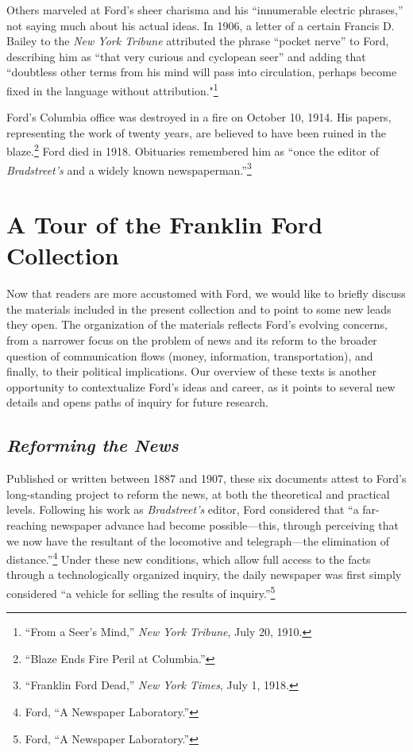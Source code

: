 \documentclass[twoside,symmetric,nobib,justified]{tufte-book}
\begin{document}
\noindent Others marveled at Ford's sheer charisma and his ``innumerable electric
phrases,'' not saying much about his actual ideas. In 1906, a letter of
a certain Francis D. Bailey to the \emph{New York Tribune} attributed
the phrase ``pocket nerve'' to Ford, describing him as ``that very
curious and cyclopean seer'' and adding that ``doubtless other terms
from his mind will pass into circulation, perhaps become fixed in the
language without attribution."\footnote{``From a Seer's Mind,''
  \emph{New York Tribune}, July 20, 1910.}

Ford's Columbia office was destroyed in a fire on October 10, 1914. His
papers, representing the work of twenty years, are believed to have been
ruined in the blaze.\footnote{``Blaze Ends Fire Peril at Columbia.''}
Ford died in 1918. Obituaries remembered him as ``once the editor of
\emph{Bradstreet's} and a widely known newspaperman.''\footnote{``Franklin
  Ford Dead,'' \emph{New York Times}, July 1, 1918.}

\hypertarget{a-tour-of-the-franklin-ford-collection}{%
\section{A Tour of the Franklin Ford
Collection}\label{a-tour-of-the-franklin-ford-collection}}

Now that readers are more accustomed with Ford, we would like to briefly
discuss the materials included in the present collection and to point to
some new leads they open. The organization of the materials reflects
Ford's evolving concerns, from a narrower focus on the problem of news
and its reform to the broader question of communication flows (money,
information, transportation), and finally, to their political
implications. Our overview of these texts is another opportunity to
contextualize Ford's ideas and career, as it points to several new
details and opens paths of inquiry for future research.

\hypertarget{reforming-the-news}{%
\subsection{\texorpdfstring{\emph{Reforming the
News}}{Reforming the News}}\label{reforming-the-news}}

Published or written between 1887 and 1907, these six documents attest
to Ford's long-standing project to reform the news, at both the
theoretical and practical levels. Following his work as
\emph{Bradstreet's} editor, Ford considered that ``a far-reaching
newspaper advance had become possible---this, through perceiving that we
now have the resultant of the locomotive and telegraph---the elimination
of distance.''\footnote{Ford, ``A Newspaper Laboratory.''} Under these
new conditions, which allow full access to the facts through a
technologically organized inquiry, the daily newspaper was first simply
considered ``a vehicle for selling the results of inquiry.''\footnote{Ford,
  ``A Newspaper Laboratory.''}
\end{document}

